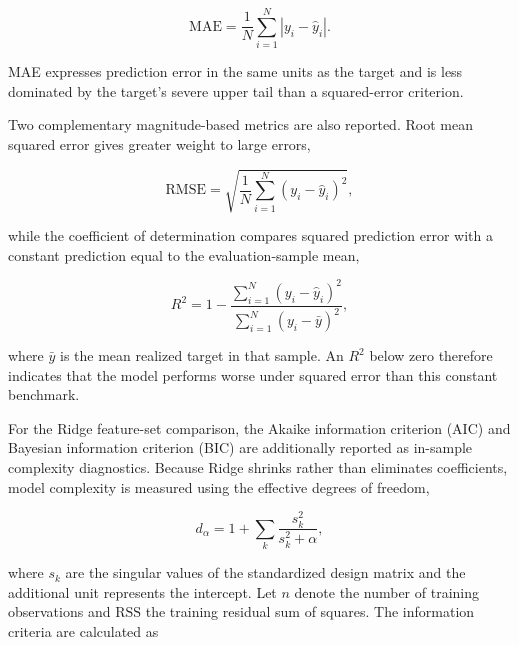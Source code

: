 \begin{equation}
    \mathrm{MAE}
    =
    \frac{1}{N}
    \sum_{i=1}^{N}
    \left|y_i-\hat{y}_i\right|.
    \label{eq:mae}
\end{equation}

\noindent
MAE expresses prediction error in the same units as the target and is less dominated by the target's severe upper tail than a squared-error criterion.

Two complementary magnitude-based metrics are also reported. Root mean squared error gives greater weight to large errors,

\begin{equation}
    \mathrm{RMSE}
    =
    \sqrt{
        \frac{1}{N}
        \sum_{i=1}^{N}
        \left(y_i-\hat{y}_i\right)^2
    },
    \label{eq:rmse}
\end{equation}

\noindent
while the coefficient of determination compares squared prediction error with a constant prediction equal to the evaluation-sample mean,

\begin{equation}
    R^2
    =
    1-
    \frac{
        \sum_{i=1}^{N}
        \left(y_i-\hat{y}_i\right)^2
    }{
        \sum_{i=1}^{N}
        \left(y_i-\bar{y}\right)^2
    },
    \label{eq:r_squared}
\end{equation}

\noindent
where \(\bar{y}\) is the mean realized target in that sample. An \(R^2\) below zero therefore indicates that the model performs worse under squared error than this constant benchmark.

For the Ridge feature-set comparison, the Akaike information criterion (AIC) and Bayesian information criterion (BIC) are additionally reported as in-sample complexity diagnostics. Because Ridge shrinks rather than eliminates coefficients, model complexity is measured using the effective degrees of freedom,

\begin{equation}
    d_{\alpha}
    =
    1+
    \sum_k
    \frac{s_k^2}{s_k^2+\alpha},
    \label{eq:ridge_effective_df}
\end{equation}

\noindent
where \(s_k\) are the singular values of the standardized design matrix and the additional unit represents the intercept. Let \(n\) denote the number of training observations and \(\mathrm{RSS}\) the training residual sum of squares. The information criteria are calculated as

